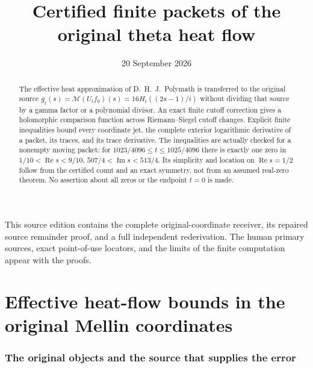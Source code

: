 \documentclass[11pt]{article}
\title{Certified finite packets of the original theta heat flow}
\author{}\date{20 September 2026}
\begin{document}
\maketitle
This source edition contains the complete original-coordinate
receiver, its repaired source remainder proof, and a full independent
rederivation. The human primary sources, exact point-of-use locators,
and the limits of the finite computation appear with the proofs.


\clearpage\begingroup
\part*{Effective heat-flow bounds in the original Mellin coordinates}
\newtheorem{pmreceivertheorem}{Theorem}
\newtheorem{pmreceiverlemma}[pmreceivertheorem]{Lemma}
\newtheorem{pmreceiverdefinition}[pmreceivertheorem]{Definition}
\newtheorem{pmreceiverremark}[pmreceivertheorem]{Remark}
\newcommand{\pmreceiverC}{\mathbb C}
\newcommand{\pmreceiverR}{\mathbb R}
\newcommand{\pmreceiverN}{\mathbb N}
\newcommand{\pmreceiverLog}{\operatorname{Log}}
\newcommand{\pmreceiverRea}{\operatorname{Re}}
\newcommand{\pmreceiverIma}{\operatorname{Im}}
\newcommand{\pmreceiverMell}{\mathcal M}
\newcommand{\pmreceiverdd}{\,\mathrm d}
\newcommand{\pmreceiverSrc}[1]{\cite[original TeX label \texttt{#1}]{pmreceiver:polymath}}



\begin{abstract}
The effective heat approximation of D.~H.~J.~Polymath is transferred to
the original source $g_t(s)=\pmreceiverMell(U_tf_0)(s)=16H_t((2s-1)/i)$ without
dividing that source by a gamma factor or a polynomial divisor.
An exact finite cutoff correction gives a holomorphic comparison
function across Riemann--Siegel cutoff changes. Explicit finite
inequalities bound every coordinate jet, the complete exterior
logarithmic derivative of a packet, its traces, and its trace derivative.
The inequalities are actually checked for a nonempty moving packet:
for $1023/4096\le t\le1025/4096$ there is exactly one zero in
$1/10<\pmreceiverRea s<9/10$, $507/4<\pmreceiverIma s<513/4$.
Its simplicity and location on $\pmreceiverRea s=1/2$ follow from the certified
count and an exact symmetry, not from an assumed real-zero theorem.
No assertion about all zeros or the endpoint $t=0$ is made.
\end{abstract}

\section{The original objects and the source that supplies the error}
\end{document}
